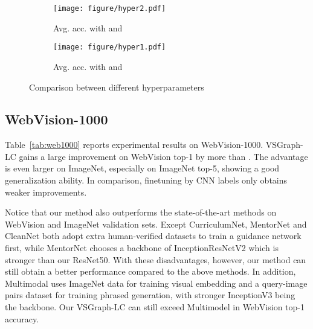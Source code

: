 \documentclass[sigconf]{acmart}
\begin{document}
\begin{figure}[t]
	\centering
	\begin{subfigure}{.23\textwidth}
		\centering
\texttt{[image: figure/hyper2.pdf]}  
		\caption{Avg. acc. with  and }
		\label{fig:hyper1}
	\end{subfigure}
	\begin{subfigure}{.23\textwidth}
		\centering
\texttt{[image: figure/hyper1.pdf]}  
		\caption{Avg. acc. with  and }
		\label{fig:hyper2}
	\end{subfigure}
\caption{Comparison between different hyperparameters}
	\label{fig:hyper}
\end{figure}

\subsection{WebVision-1000}

Table~\ref{tab:web1000} reports experimental results on WebVision-1000. VSGraph-LC gains a large improvement on WebVision top-1 by more than . The advantage is even larger on ImageNet, especially on ImageNet top-5, showing a good generalization ability. In comparison, finetuning by CNN labels only obtains weaker improvements.

Notice that our method also outperforms the state-of-the-art methods on WebVision and ImageNet validation sets. Except CurriculumNet, MentorNet and CleanNet both adopt extra human-verified datasets to train a guidance network first, while MentorNet chooses a backbone of InceptionResNetV2 which is stronger than our ResNet50. With these disadvantages, however, our method can still obtain a better performance compared to the above methods. In addition, Multimodal uses ImageNet data for training visual embedding and a query-image pairs dataset for training phrased generation, with stronger InceptionV3 being the backbone. Our VSGraph-LC can still exceed Multimodel in WebVision top-1 accuracy. 
\end{document}

